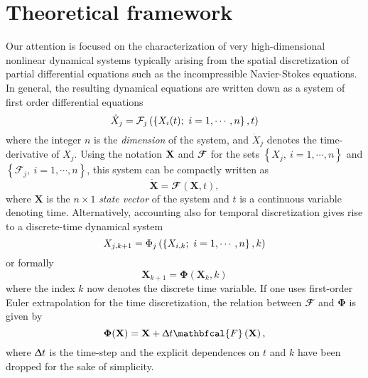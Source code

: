 \section{Theoretical framework}
\label{sec: theory}

  Our attention is focused on the characterization of very high-dimensional nonlinear dynamical systems typically arising from the spatial discretization of partial differential equations such as the incompressible Navier-Stokes equations. In general, the resulting dynamical equations are written down as a system of first order differential equations
  \begin{equation}
    \dot{X}_j = \mathcal{F}_j \left( \left\{ X_i(t);\ i =1, \cdots, n \right\}, t \right)
    \notag
  \end{equation}
  where the integer $n$ is the \emph{dimension} of the system, and $\dot{X}_j$ denotes the time-derivative of $X_j$. Using the notation $\bf{X}$ and $\mathbfcal{F}$ for the sets $\left\{ X_j,\ i =1, \cdots, n \right\}$ and $\left\{ \mathcal{F}_j,\ i =1, \cdots, n \right\}$, this system can be compactly written as
  \begin{equation}
    \dot{\mathbf{X}} = \mathbfcal{F}(\mathbf{X}, t),
    \label{eq: theory -- continuous-time dynamical system}
  \end{equation}
  where $\mathbf{X}$ is the $n \times 1$ \emph{state vector} of the system and $t$ is a continuous variable denoting time. Alternatively, accounting also for temporal discretization gives rise to a discrete-time dynamical system
  \begin{equation}
    X_{j, k+1} = \Phi_j \left( \left\{ X_{i, k};\ i = 1, \cdots, n \right\}, k \right)
    \notag
  \end{equation}
  or formally
  \begin{equation}
    \mathbf{X}_{k+1} = \bm{\Phi}(\mathbf{X}_k, k)
    \label{eq: theory -- discrete-time dynamical system}
  \end{equation}
  where the index $k$ now denotes the discrete time variable. If one uses first-order Euler extrapolation for the time discretization, the relation between $\mathbfcal{F}$ and $\bm{\Phi}$ is given by
  \begin{equation}
    \bm{\Phi}(\mathbf{X}) = \mathbf{X} + \Updelta t \mathbfcal{F}\left( \mathbf{X} \right),
    \notag
  \end{equation}
  where $\Updelta t$ is the time-step and the explicit dependences on $t$ and $k$ have been dropped for the sake of simplicity.

